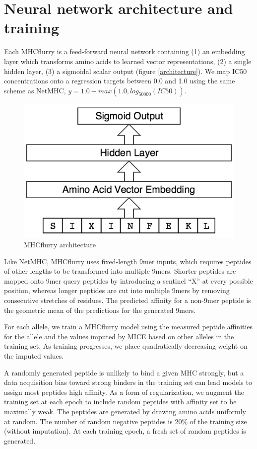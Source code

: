 \section{Neural network architecture and training}
Each MHCflurry is a feed-forward neural network containing (1) an embedding layer which transforms amino acids to learned vector representations, (2) a single hidden layer, (3) a sigmoidal scalar output (figure \ref{architecture}). We map IC50 concentrations onto a regression targets between 0.0 and 1.0 using the same scheme as NetMHC, $y = 1.0 - max(1.0, log_{50000}(IC50))$.

\begin{figure}[hr]
\centering
\includegraphics[scale=0.25]{figures/mhcflurry-gliffy-network.png}
\caption{MHCflurry architecture}
\label{fig:architecture}
\end{figure}

Like NetMHC\cite{lundegaard2008accurate}, MHCflurry uses fixed-length 9mer inputs, which requires peptides of other lengths to be transformed into multiple 9mers. Shorter peptides are mapped onto 9mer query peptides by introducing a sentinel ``X'' at every possible position, whereas longer peptides are cut into multiple 9mers by removing consecutive stretches of residues. The predicted affinity for a non-9mer peptide is the geometric mean of the predictions for the generated 9mers. 

For each allele, we train a MHCflurry model using the measured peptide affinities for the allele and the values imputed by MICE based on other alleles in the training set. As training progresses, we place quadratically decreasing weight on the imputed values.

A randomly generated peptide is unlikely to bind a given MHC strongly, but a data acquisition bias toward strong binders in the training set can lead models to assign most peptides high affinity. As a form of regularization, we augment the training set at each epoch to include random peptides with affinity set to be maximally weak. The peptides are generated by drawing amino acids uniformly at random. The number of random negative peptides is 20\% of the training size (without imputation). At each training epoch, a fresh set of random peptides is generated.

